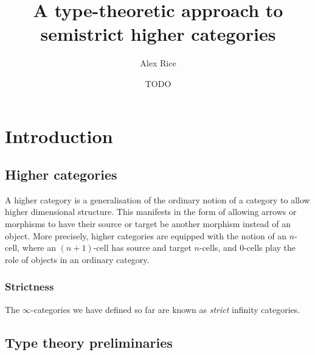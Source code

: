 \documentclass{cam-thesis}
\title{A type-theoretic approach to semistrict higher categories}
\author{Alex Rice}
\date{TODO}
\begin{document}
\frontmatter{}



\chapter{Introduction}


\section{Higher categories}
\label{sec:higher-categories}

A higher category is a generalisation of the ordinary notion of a category to allow higher dimensional structure. This manifests in the form of allowing arrows or morphisms to have their source or target be another morphism instead of an object. More precisely, higher categories are equipped with the notion of an \(n\)-cell, where an \((n+1)\)-cell has source and target \(n\)-cells, and \(0\)-cells play the role of objects in an ordinary category.





\subsection{Strictness}
\label{sec:strictness}

The \(\infty\)-categories we have defined so far are known as \emph{strict} infinity categories.




\section{Type theory preliminaries}
\label{sec:type-theory}
\end{document}
